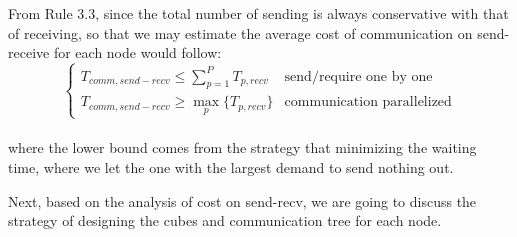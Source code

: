 \documentclass{amsart}
\theoremstyle{definition}
\theoremstyle{remark}
\numberwithin{equation}{section}
\begin{document}
\par
	From Rule 3.3, since the total number of sending is always conservative with that of receiving, so that we may estimate the average cost of communication on send-receive for each node would follow: 
\begin{equation}
\left\{
	\begin{array}{ll}  
          T_{comm,send-recv}\le\sum_{p=1}^{P}T_{p,recv}  & \text{send/require one by one}\\ 
          T_{comm,send-recv}\ge\max \limits_{p}\{T_{p,recv}\} & \text{communication parallelized}
	\end{array}
\right.
\end{equation}
\\
where the lower bound comes from the strategy that minimizing the waiting time, where we let the one with the largest demand to send nothing out.\par
	Next, based on the analysis of cost on send-recv, we are going to discuss the strategy of designing the cubes and communication tree for each node.

\end{document}
